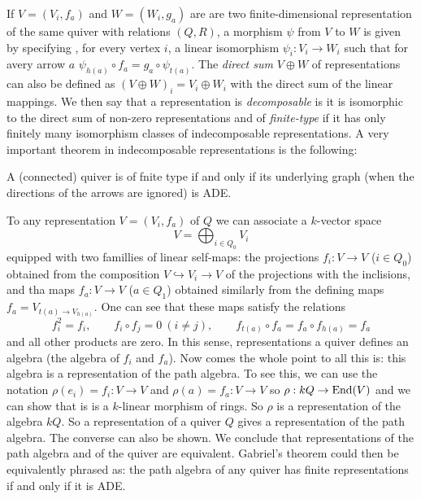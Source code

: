         If $V=(V_i,f_a)$ and $W=(W_i,g_a)$ are are two finite-dimensional representation of the same quiver with relations $(Q,R)$, a morphism $\psi$ from $V$ to $W$ is given by specifying , for every vertex $i$, a linear isomorphism $\psi_i:V_i\to W_i$ such that for avery arrow $a$ $\psi_{h(a)}\circ f_a=g_a\circ\psi_{t(a)}$. The \emph{direct sum} $V\oplus W$ of representations can also be defined as $(V\oplus W)_i=V_i\oplus W_i$ with the direct sum of the linear mappings. We then say that a representation is \emph{decomposable} is it is isomorphic to the direct sum of non-zero representations and of \emph{finite-type} if it has only finitely many isomorphism classes of indecomposable representations. A very important theorem in indecomposable representations is the following:
        \begin{theorem*}[Gabriel]
            A (connected) quiver is of fnite type if and only if its underlying graph (when the directions of the arrows are ignored) is ADE.
        \end{theorem*}
        
        To any representation $V=(V_i,f_a)$ of $Q$ we can associate a $k$-vector space
        \begin{equation}
            V=\bigoplus_{i \in Q_0}V_i
        \end{equation}
        equipped with two famillies of linear self-maps: the projections $f_i:V\to V$ ($i\in Q_0$) obtained from the composition $V\hookrightarrow V_i\to V$ of the projections with the inclisions, and tha maps $f_a:V\to V$ ($a\in Q_1$) obtained similarly from the defining maps $f_a=V_{t(a)\to V_{h(a)}}$. One can see that these maps satisfy the relations
        \begin{equation}
            f^2_i=f_i,\qquad f_i\circ f_j=0~(i\neq j),\qquad f_{t(a)}\circ f_a=f_a\circ f_{h(a)}=f_a
        \end{equation}
        and all other products are zero. In this sense, representations a quiver defines an algebra (the algebra of $f_i$ and $f_a$). Now comes the whole point to all this is: this algebra is a representation of the path algebra. To see this, we can use the notation $\rho(e_i)=f_i:V\to V$ and $\rho(a)=f_a:V\to V$ so $\rho:kQ\to \text{End}(V)$ and we can show that is is a $k$-linear morphism of rings. So $\rho$ is a representation of the algebra $kQ$. So a representation of a quiver $Q$ gives a representation of the path algebra. The converse can also be shown. We conclude that representations of the path algebra and of the quiver are equivalent. Gabriel's theorem could then be equivalently phrased as: the path algebra of any quiver has finite representations if and only if it is ADE.
        
